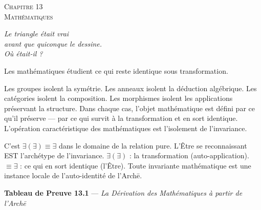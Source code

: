 \documentclass[10pt, openany, oneside]{book}
\renewcommand{\large}{\fontsize{11.5}{14}\selectfont}
\renewcommand{\huge}{\fontsize{17}{21}\selectfont}
\begin{document}
\begin{center}
    {\huge\scshape Chapitre 13}\\[0.3em]
    {\large\scshape Mathématiques}
\end{center}

\vspace{1.5em}

\begin{center}
    \itshape
    Le triangle était vrai\\
    avant que quiconque le dessine.\\
    Où était-il ?
\end{center}

\vspace{2em}


\noindent Les mathématiques étudient ce qui reste identique sous transformation.

Les groupes isolent la symétrie. Les anneaux isolent la déduction algébrique. Les catégories isolent la composition. Les morphismes isolent les applications préservant la structure. Dans chaque cas, l'objet mathématique est défini par ce qu'il préserve --- par ce qui survit à la transformation et en sort identique. L'opération caractéristique des mathématiques est l'isolement de l'invariance.

C'est $\exists(\exists) \equiv \exists$ dans le domaine de la relation pure. L'Être se reconnaissant EST l'archétype de l'invariance. $\exists(\exists)$ : la transformation (auto-application). $\equiv \exists$ : ce qui en sort identique (l'Être). Toute invariante mathématique est une instance locale de l'auto-identité de l'Arch\={e}.

\vspace{0.5em}

\textbf{Tableau de Preuve 13.1} --- \textit{La Dérivation des Mathématiques à partir de l'Arch\={e}}

\vspace{0.5em}
\end{document}
